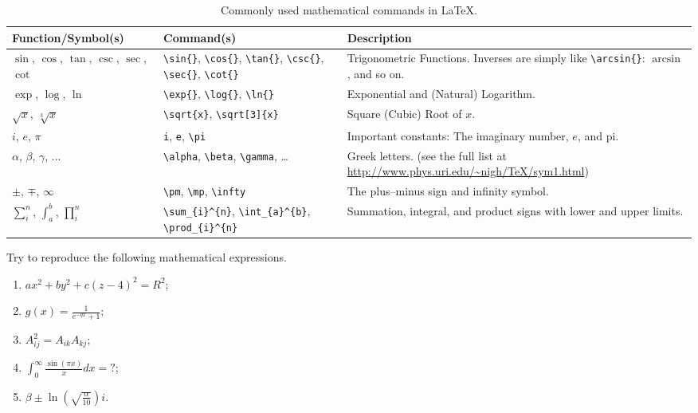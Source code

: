 \begin{table}[ht!]
\begin{tabularx}{\textwidth}{|p{}|>{\raggedright}p{}|X|}
\hline
Function/Symbol(s) & Command(s) & Description \\
\hline
$\sin$, $\cos$, $\tan$, $\csc$, $\sec$, $\cot$ & \texttt{\textbackslash sin\{\}}, \texttt{\textbackslash cos\{\}}, \texttt{\textbackslash tan\{\}}, \texttt{\textbackslash csc\{\}}, \texttt{\textbackslash sec\{\}}, \texttt{\textbackslash cot\{\}} & Trigonometric Functions. Inverses are simply like \texttt{\textbackslash arcsin\{\}}: $\arcsin$, and so on. \\
\hline
$\exp$, $\log$, $\ln$ & \texttt{\textbackslash exp\{\}}, \texttt{\textbackslash log\{\}}, \texttt{\textbackslash ln\{\}} & Exponential and (Natural) Logarithm. \\
\hline
$\sqrt{x}$, $\sqrt[3]{x}$ & \texttt{\textbackslash sqrt\{x\}}, \texttt{\textbackslash sqrt[3]\{x\}} & Square (Cubic) Root of $x$. \\
\hline
$i$, $e$, $\pi$ & \texttt{i}, \texttt{e}, \texttt{\textbackslash pi} & Important constants: The imaginary number, $e$, and pi. \\
\hline
$\alpha$, $\beta$, $\gamma$, $\ldots$ & \texttt{\textbackslash alpha}, \texttt{\textbackslash beta}, \texttt{\textbackslash gamma}, \ldots & Greek letters. (see the full list at \href{http://www.phys.uri.edu/~nigh/TeX/sym1.html}{http://www.phys.uri.edu/\~{}nigh/\allowbreak TeX/sym1.html}) \\
\hline
$\pm$, $\mp$, $\infty$ & \texttt{\textbackslash pm}, \texttt{\textbackslash mp}, \texttt{\textbackslash infty} & The plus--minus sign and infinity symbol. \\
\hline
$\sum_i^n$, $\int_a^b$, $\prod_i^n$ & \texttt{\textbackslash sum\_\{i\}\^{}\{n\}}, \texttt{\textbackslash int\_\{a\}\^{}\{b\}}, \texttt{\textbackslash prod\_\{i\}\^{}\{n\}} & Summation, integral, and product signs with lower and upper limits. \\
\hline
\end{tabularx}
\caption{Commonly used mathematical commands in \LaTeX{}.}
\label{tab:functions}
\end{table}
\begin{exercisebox}
\begin{Exercise}
Try to reproduce the following mathematical expressions.
\begin{enumerate}[label=\alph*)]
    \item $ax^2 + by^2 + c(z-4)^2 = R^2$;
    \item $g(x) = \frac{1}{e^{-qx}+1}$;
    \item $A^2_{ij} = A_{ik}A_{kj}$;
    \item $\int_0^{\infty} \frac{\sin(\pi x)}{x}dx = ?$;\footnotemark
    \item $\beta\pm\ln(\sqrt{\frac{\alpha}{10}})i$.
\end{enumerate}
\end{Exercise}
\end{exercisebox}
